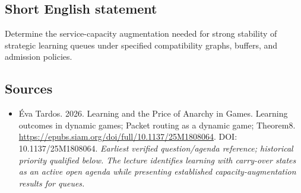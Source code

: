 \documentclass[11pt]{article}
\begin{document}
\subsection{Short English statement}
Determine the service-capacity augmentation needed for strong stability of strategic learning queues under specified compatibility graphs, buffers, and admission policies.

\subsection{Sources}
\begin{itemize}\raggedright
\item[\textnormal{[S1]}]\hypertarget{source:30007568:1}{} Éva Tardos. 2026. Learning and the Price of Anarchy in Games. Learning outcomes in dynamic games; Packet routing as a dynamic game; Theorem8.
\url{https://epubs.siam.org/doi/full/10.1137/25M1808064}.
DOI: 10.1137/25M1808064.
{\small\textit{Earliest verified question/agenda reference; historical priority qualified below. The lecture identifies learning with carry-over states as an active open agenda while presenting established capacity-augmentation results for queues.}}
\end{itemize}
\end{document}
